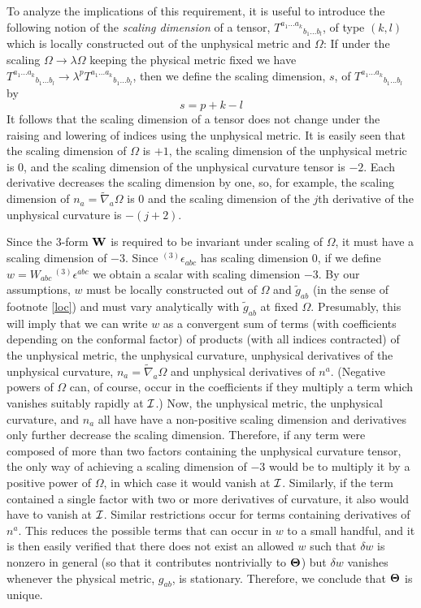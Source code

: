 To analyze the implications of this requirement, it is useful to
introduce the following notion of the {\it scaling dimension} \cite{g}
of a tensor, ${T^{a_1 ... a_k}}_{b_1 ... b_l}$, of type $(k,l)$ which
is locally constructed out of the unphysical metric and $\Omega$: If
under the scaling $\Omega \rightarrow \lambda \Omega$ keeping the
physical metric fixed we have ${T^{a_1 ... a_k}}_{b_1 ... b_l}
\rightarrow \lambda^p {T^{a_1 ... a_k}}_{b_1 ... b_l}$, then we define
the scaling dimension, $s$, of ${T^{a_1 ... a_k}}_{b_1 ... b_l}$ by
\begin{equation}
s = p + k - l
\label{scale}
\end{equation}
It follows that the scaling dimension of a tensor does not change under
the raising and lowering of indices using the unphysical metric. It is
easily seen that the scaling dimension of $\Omega$ is $+1$, the scaling
dimension of the unphysical metric is $0$, and the scaling dimension of the
unphysical curvature tensor is $-2$. Each derivative decreases the
scaling dimension by one, so, for example, the scaling dimension of $n_a =
\tilde{\nabla}_a \Omega$ is $0$ and the scaling dimension of the $j$th
derivative of the unphysical curvature is $-(j+2)$. 

Since the $3$-form $\bf W$ is required to be invariant under scaling
of $\Omega$, it must have a scaling dimension of $-3$. Since ${}^{(3)}
\epsilon_{abc}$ has scaling dimension $0$, if we define $w = W_{abc}
\, {}^{(3)} \epsilon^{abc}$ we obtain a scalar with scaling dimension
$-3$. By our assumptions, $w$ must be locally constructed out of
$\Omega$ and $\tilde{g}_{ab}$ (in the sense of footnote \ref{loc}) and
must vary analytically with $\tilde{g}_{ab}$ at fixed
$\Omega$. Presumably, this will imply that we can write $w$ as a
convergent sum of terms (with coefficients depending on the conformal
factor) of products (with all indices contracted) of the unphysical
metric, the unphysical curvature, unphysical derivatives of the
unphysical curvature, $n_a = \tilde{\nabla}_a \Omega$ and unphysical
derivatives of $n^a$. (Negative powers of $\Omega$ can, of course,
occur in the coefficients if they multiply a term which vanishes
suitably rapidly at $\cal I$.) Now, the unphysical metric, the
unphysical curvature, and $n_a$ all have have a non-positive scaling
dimension and derivatives only further decrease the scaling
dimension. Therefore, if any term were composed of more than two
factors containing the unphysical curvature tensor, the only way of
achieving a scaling dimension of $-3$ would be to multiply it by a
positive power of $\Omega$, in which case it would vanish at $\cal
I$. Similarly, if the term contained a single factor with two or more
derivatives of curvature, it also would have to vanish at $\cal
I$. Similar restrictions occur for terms containing derivatives of
$n^a$. This reduces the possible terms that can occur in $w$ to a
small handful, and it is then easily verified that there does not
exist an allowed $w$ such that $\delta w$ is nonzero in general (so
that it contributes nontrivially to ${\mbox{\boldmath $\Theta$}}$) but
$\delta w$ vanishes whenever the physical metric, $g_{ab}$, is
stationary. Therefore, we conclude that ${\mbox{\boldmath $\Theta$}}$
is unique.

